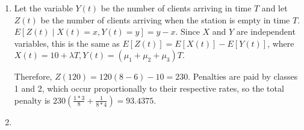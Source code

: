\begin{solution}

    \begin{enumerate}
        \item Let the variable $Y(t)$ be the number of clients arriving
            in time $T$ and let $Z(t)$ be the number of clients arriving
            when the station is empty in time $T$. $E[Z(t) \mid X(t) =
            x, Y(t) = y] = y - x$. Since $X$ and $Y$ are independent
            variables, this is the same as $E[Z(t)] = E[X(t)] -
            E[Y(t)]$, where $X(t) = 10 + \lambda T, Y(t) = (\mu_1 +
            \mu_2 + \mu_3)T$.

            Therefore, $Z(120) = 120(8 - 6) - 10 = 230$. Penalties are
            paid by classes 1 and 2, which occur proportionally to their
            respective rates, so the total penalty is $230(\frac{1 *
            3}{8} + \frac{1}{8 * 4}) = 93.4375$.

        \item 

    \end{enumerate}

\end{solution}
